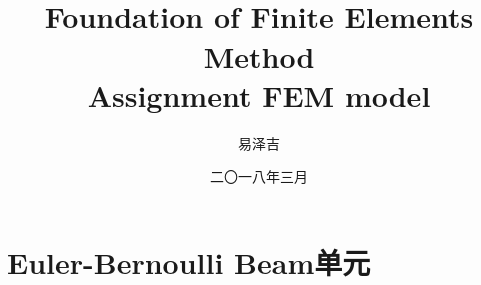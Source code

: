 \documentclass[forprint]{WHUBachelor}
\begin{document}



\title{\\Foundation of Finite Elements Method\\Assignment FEM model}

\author{易泽吉}                            %



\date{二〇一八年三月}                    %


\maketitle
\frontmatter
{}              %

\mainmatter %
\section{Euler-Bernoulli Beam单元}
\end{document}
